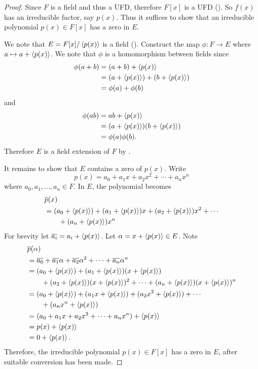\begin{proof}
    Since $F$ is a field and thus a UFD, therefore $F[x]$ is a UFD (). So $f(x)$ has an irreducible factor, say $p(x)$. Thus it suffices to show that an irreducible polynomial $p(x) \in F[x]$ has a zero in $E$.

    We note that $E = F[x]/\left\langle p(x)\right\rangle$ is a field (). Construct the map $\phi: F \to E$ where $a \mapsto a + \left\langle p(x)\right\rangle$. We note that $\phi$ is a homomorphism between fields since
    \begin{align*}
        \phi(a+b) &= (a+b) + \left\langle p(x)\right\rangle\\
        &= (a + \left\langle p(x)\right\rangle) + (b + \left\langle p(x)\right\rangle)\\
        &= \phi(a) + \phi(b)
    \end{align*}
    and
    \begin{align*}
        \phi(ab) &= ab + \left\langle p(x)\right\rangle\\
        &= (a+\left\langle p(x)\right\rangle)(b+\left\langle p(x)\right\rangle)\\
        &= \phi(a)\phi(b).
    \end{align*}
    Therefore $E$ is a field extension of $F$ by .

    It remains to show that $E$ contains a zero of $p(x)$. Write
    \[
        p(x) = a_0 + a_1x + a_2x^2 + \cdots + a_nx^n
    \]
    where $a_0, a_1, \dots, a_n \in F$. In $E$, the polynomial becomes
    \begin{align*}
        &\overline{p}(x)\\
        &= (a_0 + \left\langle p(x)\right\rangle) + (a_1 + \left\langle p(x)\right\rangle)x + (a_2 + \left\langle p(x)\right\rangle)x^2 + \cdots\\
        &\quad\quad+ (a_n + \left\langle p(x)\right\rangle)x^n
    \end{align*}
    For brevity let $\overline{a_i} = a_i + \left\langle p(x)\right\rangle$. Let $\alpha = x + \left\langle p(x)\right\rangle \in E$. Note
    \begin{align*}
        &\overline{p}(\alpha)\\
        &= \overline{a_0} + \overline{a_1}\alpha + \overline{a_2}\alpha^2 + \cdots + \overline{a_n}\alpha^n\\
        &= (a_0 + \left\langle p(x)\right\rangle) + (a_1 + \left\langle p(x)\right\rangle)(x + \left\langle p(x)\right\rangle) \\
        &\quad\quad+ (a_2 + \left\langle p(x)\right\rangle)(x + \left\langle p(x)\right\rangle)^2 + \cdots + (a_n + \left\langle p(x)\right\rangle)(x + \left\langle p(x)\right\rangle)^n\\
        &= (a_0 + \left\langle p(x)\right\rangle) + (a_1x + \left\langle p(x)\right\rangle) + (a_2x^2 + \left\langle p(x)\right\rangle) + \cdots\\
        &\quad\quad+ (a_nx^n + \left\langle p(x)\right\rangle)\\
        &= (a_0 + a_1x + a_2x^2 + \cdots + a_nx^n) + \left\langle p(x)\right\rangle\\
        &= p(x) + \left\langle p(x)\right\rangle\\
        &= 0 + \left\langle p(x)\right\rangle.
    \end{align*}
    Therefore, the irreducible polynomial $p(x) \in F[x]$ has a zero in $E$, after suitable conversion has been made.
\end{proof}

